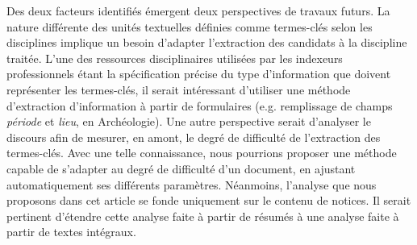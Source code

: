   Des deux facteurs identifiés émergent deux perspectives de travaux futurs.
  La nature différente des unités textuelles définies comme termes-clés selon
  les disciplines implique un besoin d'adapter l'extraction des candidats à la
  discipline traitée. L'une des ressources disciplinaires utilisées par les
  indexeurs professionnels étant la spécification précise du type d'information
  que doivent représenter les termes-clés, il serait intéressant d'utiliser une
  méthode d'extraction d'information à partir de formulaires (e.g. remplissage
  de champs \textit{période} et \textit{lieu}, en Archéologie). Une autre perspective serait
  d'analyser le discours afin de mesurer, en amont, le degré de difficulté de
  l'extraction des termes-clés. Avec une telle connaissance, nous pourrions
  proposer une méthode capable de s'adapter au degré de difficulté d'un
  document, en ajustant automatiquement ses différents paramètres. Néanmoins,
  l'analyse que nous proposons dans cet article se fonde uniquement sur le
  contenu de notices. Il serait pertinent d'étendre cette analyse faite à partir
  de résumés à une analyse faite à partir de textes intégraux.

